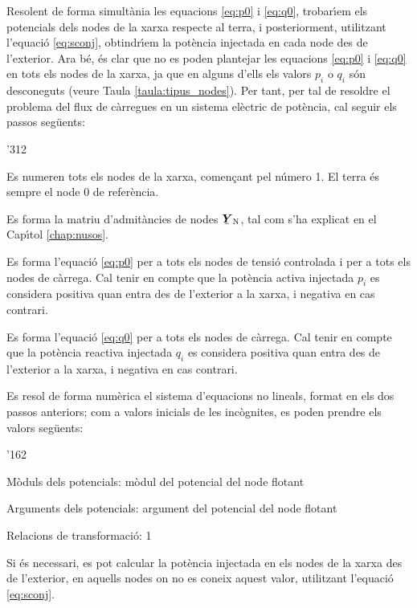 Resolent de forma simult\`{a}nia les equacions \eqref{eq:p0} i \eqref{eq:q0}, trobar\'{\i}em els
potencials dels nodes de la xarxa respecte al terra, i posteriorment, utilitzant l'equaci\'{o} \eqref{eq:sconj},
obtindr\'{\i}em la pot\`{e}ncia injectada en cada node des de l'exterior. Ara b\'{e}, \'{e}s clar que no es
poden plantejar les equacions \eqref{eq:p0} i \eqref{eq:q0} en tots els nodes de la xarxa,
ja que en alguns d'ells els valors $p_i$ o $q_i$ s\'{o}n desconeguts (veure Taula
\vref{taula:tipus_nodes}). Per tant, per tal de resoldre el problema del flux de c\`{a}rregues
en un sistema el\`{e}ctric de pot\`{e}ncia, cal seguir els passos seg\"{u}ents:
\begin{dingautolist}{'312}
    \item Es numeren tots els nodes de la xarxa, comen\c{c}ant pel n\'{u}mero 1. El terra \'{e}s sempre el node 0 de refer\`{e}ncia.
   \item Es forma la matriu d'admit\`{a}ncies de nodes $\mcmplx{Y}\ped{N}$, tal com s'ha
   explicat en el Cap\'{\i}tol \ref{chap:nusos}.
   \item Es forma l'equaci\'{o} \eqref{eq:p0} per a tots els nodes de tensi\'{o} controlada i per
   a tots els nodes de c\`{a}rrega. Cal tenir en compte que la pot\`{e}ncia activa  injectada $p_i$ es considera
   positiva quan entra des de l'exterior a la xarxa, i negativa en cas contrari.
   \item Es forma l'equaci\'{o} \eqref{eq:q0} per a tots els nodes de c\`{a}rrega. Cal tenir en compte
   que la pot\`{e}ncia reactiva injectada $q_i$  es considera positiva quan entra des de l'exterior a la xarxa, i negativa en cas contrari.
   \item Es resol de forma num\`{e}rica el sistema d'equacions no lineals, format en els dos
   passos anteriors; com a valors inicials de les inc\`{o}gnites, es poden prendre els valors
   seg\"{u}ents:
   \begin{dinglist}{'162}
    \item M\`{o}duls dels potencials: m\`{o}dul del potencial del node flotant
    \item Arguments dels potencials: argument del potencial del node flotant
    \item Relacions de transformaci\'{o}: 1
   \end{dinglist}
   \item Si \'{e}s necessari,  es pot calcular la pot\`{e}ncia injectada en els nodes de la xarxa
   des de l'exterior, en aquells nodes on no es
   coneix aquest valor, utilitzant    l'equaci\'{o} \eqref{eq:sconj}.
\end{dingautolist}

